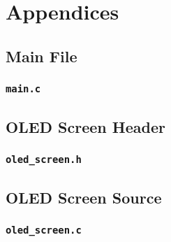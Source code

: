 \section{Appendices}

\subsection{Main File}\label{sec:main_c}
\subsubsection{\texttt{main.c}}


\subsection{OLED Screen Header}
\subsubsection{\texttt{oled\_screen.h}}


\subsection{OLED Screen Source}\label{sec:oled_screen_c}
\subsubsection{\texttt{oled\_screen.c}}
